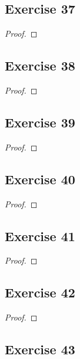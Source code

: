 \documentclass[14pt]{extarticle}
\begin{document}
\subsection{Exercise 37}

\begin{proof}

\end{proof}

\subsection{Exercise 38}

\begin{proof}

\end{proof}

\subsection{Exercise 39}

\begin{proof}

\end{proof}

\subsection{Exercise 40}

\begin{proof}

\end{proof}

\subsection{Exercise 41}

\begin{proof}

\end{proof}

\subsection{Exercise 42}

\begin{proof}

\end{proof}

\subsection{Exercise 43}
\end{document}

